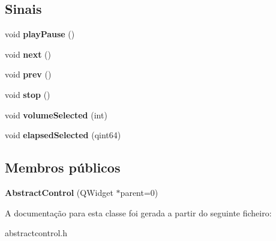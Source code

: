 \subsection*{Sinais}
\begin{DoxyCompactItemize}
\item 
\hypertarget{class_abstract_control_ad2e9ced2f1cc8843b0d41aed65147940}{void {\bfseries play\-Pause} ()}\label{class_abstract_control_ad2e9ced2f1cc8843b0d41aed65147940}

\item 
\hypertarget{class_abstract_control_a2d22cb619310c6e5124714f50752785e}{void {\bfseries next} ()}\label{class_abstract_control_a2d22cb619310c6e5124714f50752785e}

\item 
\hypertarget{class_abstract_control_a4d4c1291abf6badfcc50bc5b0f29a4e7}{void {\bfseries prev} ()}\label{class_abstract_control_a4d4c1291abf6badfcc50bc5b0f29a4e7}

\item 
\hypertarget{class_abstract_control_a8deefe7ec20ba2828132c0f4dd7ec2d2}{void {\bfseries stop} ()}\label{class_abstract_control_a8deefe7ec20ba2828132c0f4dd7ec2d2}

\item 
\hypertarget{class_abstract_control_ab87486a10333c41af89e9f2f1e4aa00b}{void {\bfseries volume\-Selected} (int)}\label{class_abstract_control_ab87486a10333c41af89e9f2f1e4aa00b}

\item 
\hypertarget{class_abstract_control_a4ef5f5771ae42561aec365a9aabe4615}{void {\bfseries elapsed\-Selected} (qint64)}\label{class_abstract_control_a4ef5f5771ae42561aec365a9aabe4615}

\end{DoxyCompactItemize}
\subsection*{Membros públicos}
\begin{DoxyCompactItemize}
\item 
\hypertarget{class_abstract_control_a2caef38ad55c0589a073a3ead352c7ad}{{\bfseries Abstract\-Control} (Q\-Widget $\ast$parent=0)}\label{class_abstract_control_a2caef38ad55c0589a073a3ead352c7ad}

\end{DoxyCompactItemize}


A documentação para esta classe foi gerada a partir do seguinte ficheiro\-:\begin{DoxyCompactItemize}
\item 
abstractcontrol.\-h\end{DoxyCompactItemize}
